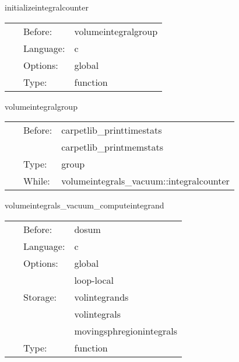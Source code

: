 
\hspace{5mm} initializeintegralcounter 

\hspace{5mm}{\it initialize integralcounter variable } 


\hspace{5mm}

 \begin{tabular*}{160mm}{cll} 
~ & Before:  & volumeintegralgroup \\ 
~ & Language:  & c \\ 
~ & Options:  & global \\ 
~ & Type:  & function \\ 
\end{tabular*} 


\vspace{5mm}


\hspace{5mm} volumeintegralgroup 

\hspace{5mm}{\it evaluate all volume integrals } 


\hspace{5mm}

 \begin{tabular*}{160mm}{cll} 
~ & Before:  & carpetlib\_printtimestats \\ 
~& ~ &carpetlib\_printmemstats\\ 
~ & Type:  & group \\ 
~ & While:  & volumeintegrals\_vacuum::integralcounter \\ 
\end{tabular*} 


\vspace{5mm}


\hspace{5mm} volumeintegrals\_vacuum\_computeintegrand 

\hspace{5mm}{\it compute integrand } 


\hspace{5mm}

 \begin{tabular*}{160mm}{cll} 
~ & Before:  & dosum \\ 
~ & Language:  & c \\ 
~ & Options:  & global \\ 
~& ~ &loop-local\\ 
~ & Storage:  & volintegrands \\ 
~& ~ &volintegrals\\ 
~& ~ &movingsphregionintegrals\\ 
~ & Type:  & function \\ 
\end{tabular*} 


